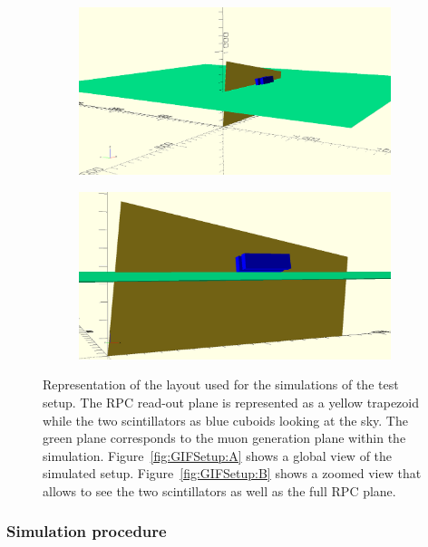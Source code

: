 	\begin{figure}[H]
		\begin{subfigure}{\linewidth}
			\centering
			\includegraphics[width = 0.8\plotwidth]{fig/chapt5/GIFSetup-SimA.png}\\
			\caption{\label{fig:SimGIFLay:A}}
		\end{subfigure}
		\begin{subfigure}{\linewidth}
			\centering
			\includegraphics[width = 0.8\plotwidth]{fig/chapt5/GIFSetup-SimB.png}
			\caption{\label{fig:SimGIFLay:B}}
		\end{subfigure}
		\caption{\label{fig:SimGIFLay} Representation of the layout used for the simulations of the test setup. The RPC read-out plane is represented as a yellow trapezoid while the two scintillators as blue cuboids looking at the sky. The green plane corresponds to the muon generation plane within the simulation. Figure~\ref{fig:GIFSetup:A} shows a global view of the simulated setup. Figure~\ref{fig:GIFSetup:B} shows a zoomed view that allows to see the two scintillators as well as the full RPC plane.}
	\end{figure}
		
		\subsubsection{Simulation procedure}
		\label{chapt5:sssec:SimProc}
		
